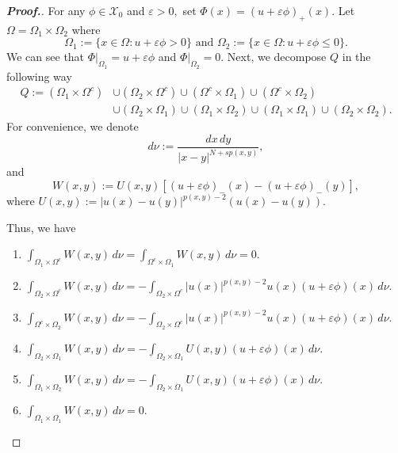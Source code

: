 \documentclass[11pt]{article}
\newcommand{\X}{\mathcal{X}_{0}}
\newcommand{\Q}{\textit{Q}}
\newcommand{\ve}{\varepsilon}
\newcommand{\om} {\Omega}
\newcommand{\ds} {\displaystyle}
\begin{document}
\begin{proof}[\bf Proof.]
    For any $\phi\in \X$
and $\ve>0,$
set $\Phi(x)=(u+\ve\phi)_+(x).$
Let $\om=\om_1\times\om_2$
where
$$
    \om_1:=\{x\in\om:u+\ve\phi>0\}
    \text{ and } 
    \om_2:=\{x\in\om:u+\ve\phi\le0\}.
    $$
    We can see that $\Phi|_{\om_1}=u+\ve\phi$
and $\Phi|_{\om_2}=0.$
Next, we decompose $\Q$
in the following way
\begin{align*}
\Q:= (\om_1\times\om^c) 
& \cup(\om_2\times\om^c)
\cup(\om^c\times\om_1)  
  \cup (\om^c\times\om_2) \\ &
\cup(\om_2\times\om_1)\cup
 (\om_1\times\om_2)   \cup(\om_1\times\om_1)\cup
  (\om_2\times\om_2).
\end{align*}
For convenience, 
we denote 
$$
d \nu := \frac{dx \, dy}{|x-y|^{N+sp(x,y)}},
$$
and
$$
W(x,y):=U(x,y)[(u+\ve\phi)_-(x)-(u+\ve\phi)_-(y)] ,
$$
where $U(x,y):=|u(x)-u(y)|^{p(x,y)-2}(u(x)-u(y))$.

Thus, we have
\begin{enumerate}
\item[(i)]$\ds
\int_{\om_1\times\om^c}W(x,y)\,d\nu=
\int_{\om^c\times\om_1}W(x,y)\,d\nu=0.$

\item[(ii)]$\ds 
\int_{\om_2\times\om^c}W(x,y)\,d\nu=-
\int_{\om_2\times\om^c}|u(x)|^{p(x,y)-2}u(x)
(u+\ve\phi)(x) \,d\nu.$

\item[(iii)]$\ds 
\int_{\om^c\times\om_2}W(x,y)\,d\nu=-
\int_{\om_2\times\om^c}|u(x)|^{p(x,y)-2}u(x)
(u+\ve\phi)(x) \,d\nu.$

\item[(iv)]$\ds 
\int_{\om_2\times\om_1}W(x,y)\,d\nu=-
\int_{\om_2\times\om_1}U(x,y)(u+\ve\phi)
(x) \,d\nu.$

\item[(v)]$\ds 
\int_{\om_1\times\om_2}W(x,y)\,d\nu=-
\int_{\om_2\times\om_1}U(x,y)
(u+\ve\phi)(x) \,d\nu.$

\item[(vi)]$\ds 
\int_{\om_1\times\om_1}W(x,y)\,d\nu=0.$


\end{enumerate}
\end{proof}
\end{document}
